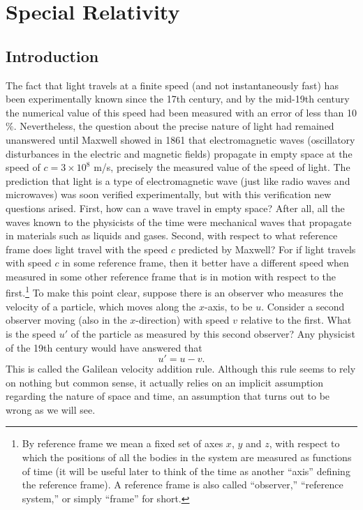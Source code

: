 \chapter{Special Relativity}

\section{Introduction}

The fact that light travels at a finite speed (and not instantaneously fast) has been experimentally known since the 17th century, and by the mid-19th century the numerical value of this speed had been measured with an error of less than 10$\%$. Nevertheless, the question about the precise nature of light had remained unanswered until Maxwell showed in 1861 that electromagnetic waves (oscillatory disturbances in the electric and magnetic fields) propagate in empty space at the speed of $c=3\times10^8$ m/s, precisely the measured value of the speed of light. The prediction that light is a type of electromagnetic wave (just like radio waves and microwaves) was soon verified experimentally, but with this verification new questions arised. First, how can a wave travel in empty space? After all, all the waves known to the physicists of the time were mechanical waves that propagate in materials such as liquids and gases. Second, with respect to what reference frame does light travel with the speed $c$ predicted by 
Maxwell? For if light travels with speed $c$ in some reference frame, then it better have a different speed when measured in some other reference frame that is in motion with respect to the first.\footnote{By reference frame we mean a fixed set of axes $x$, $y$ and $z$, with respect to which the positions of all the bodies in the system are measured as functions of time (it will be useful later to think of the time as another ``axis'' defining the reference frame). A reference frame is also called ``observer,'' ``reference system,'' or simply ``frame'' for short.} To make this point clear, suppose there is an observer who measures the velocity of a particle, which moves along the $x$-axis, to be $u$. Consider a second observer moving (also in the $x$-direction) with speed $v$ relative to the first. What is the speed $u'$ of the particle as measured by this second observer? Any physicist of the 19th century would have answered that
\begin{equation} \label{eq:galilean_vel_rule}
u'=u-v.
\end{equation}
This is called the Galilean velocity addition rule. Although this rule seems to rely on nothing but common sense, it actually relies on an implicit assumption regarding the nature of space and time, an assumption that turns out to be wrong as we will see.

